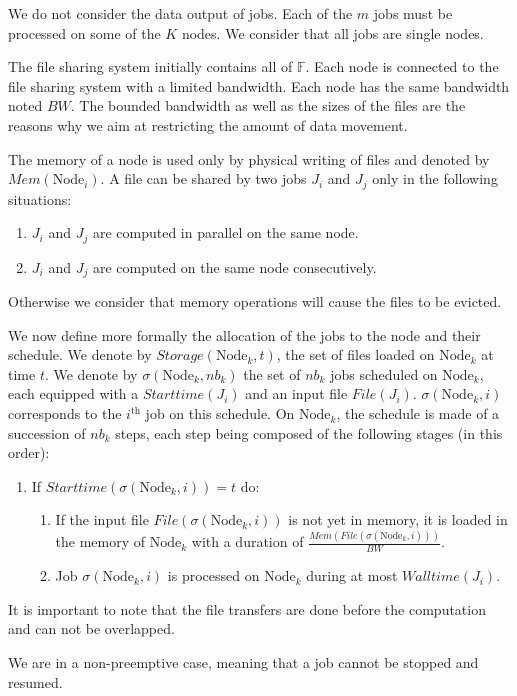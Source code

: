 \documentclass[conference,10pt]{IEEEtran}
\newcommand{\Node}[1]{\ensuremath{\mathrm{Node}_{#1}}\xspace}
\newcommand{\file}{\ensuremath{\mathit{File}}\xspace}
\newcommand{\storage}{\ensuremath{\mathit{Storage}}\xspace}
\newcommand{\memory}{\ensuremath{\mathit{Mem}}\xspace}
\newcommand{\bandwidth}{\mathit{BW}\xspace}
\newcommand{\walltime}{\mathit{Walltime}\xspace}
\newcommand{\start}{\mathit{Starttime}\xspace}
\newcommand{\fileset}{\ensuremath{\mathbb{F}}\xspace}
\begin{document}
We do not consider the data output of jobs.
Each of the $m$ jobs must be processed on some of the $K$ nodes. 
We consider that all jobs are single nodes.

The file sharing system initially contains all of $\fileset$.
Each node is connected to the file sharing system with a limited bandwidth.
Each node has the same bandwidth noted $\bandwidth$.
The bounded bandwidth as well as the sizes of the files are the reasons why
we aim at restricting the amount of data movement.

The memory of a node is used only by physical writing of files and denoted by $\memory(\Node{i})$.
A file can be shared by two jobs $J_i$ and $J_j$ only in the following situations:
\begin{enumerate}
	\item $J_i$ and $J_j$ are computed in parallel on the same node.
	\item $J_i$ and $J_j$ are computed on the same node consecutively.
\end{enumerate}
Otherwise we consider that memory operations will cause the files to be evicted.

We now define more formally the allocation of the jobs to the node and
their schedule.
We denote by $\storage(\Node{k}, t)$, the set of files loaded on $\Node{k}$
at time $t$. 
We denote by $\sigma(\Node{k}, \mathit{nb}_k)$ the set of $\mathit{nb}_k$ jobs
scheduled on $\Node{k}$, each equipped with a $\start(J_i)$ and an
input file $\file(J_i)$.
$\sigma(\Node{k}, i)$ corresponds to the $i^\text{th}$ job on this schedule.
On $\Node{k}$, the schedule is made of a
succession of $\mathit{nb}_k$
steps, each step being composed of the
following stages (in this order):
\begin{enumerate}
	\item If $\start(\sigma(\Node{k}, i)) = t$ do:
	\begin{enumerate}
		\item If the input file $\file(\sigma(\Node{k}, i))$ is not yet in memory, it is 
		loaded in the memory of $\Node{k}$ with a duration of $\frac{\memory(\file(\sigma(\Node{k}, i)))}{\bandwidth}$.
		\item Job $\sigma(\Node{k}, i)$ is processed on $\Node{k}$ during at most $\walltime(J_i)$.
	\end{enumerate}
\end{enumerate}
It is important to note that the file transfers are done before the computation and can not be overlapped.

We are in a non-preemptive case, meaning that a job cannot be stopped and resumed.
\end{document}
